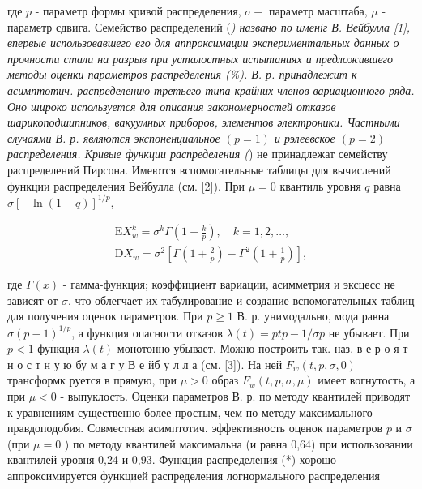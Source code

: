 \documentclass[10pt]{article}
\begin{document}
где $p$ - параметр формы кривой распределения, $\sigma-$ параметр масштаба, $\mu$ - параметр сдвига. Семейство распределений (\textit{) названо по именіг В. Вейбулла [1], впервые использовавшего его для аппроксимации экспериментальных данных о прочности стали на разрыв при усталостных испытаниях и предложившего методы оценки параметров распределения (\%). В. р. принадлежит к асимптотич. распределению третьего типа крайних членов вариационного ряда. Оно широко используется для описания закономерностей отказов шарикоподшипников, вакуумных приборов, элементов әлектроники. Частными случаями В. р. являются экспоненциальное $(p=1)$ и рэлеевское $(p=2)$ распределения. Кривые функции распределения (}) не принадлежат семейству распределений Пирсона. Имеются вспомогательные таблицы для вычислений функции распределения Вейбулла (см. [2]). При $\mu=0$ квантиль уровня $q$ равна $\sigma[-\ln (1-q)]^{1 / p}$,



\[

\begin{gathered}

\mathrm{E} X_{w}^{k}=\sigma^{k} \Gamma\left(1+\frac{k}{p}\right), \quad k=1,2, \ldots, \\

\mathrm{D} X_{w}=\sigma^{2}\left[\Gamma\left(1+\frac{2}{p}\right)-\Gamma^{2}\left(1+\frac{1}{p}\right)\right],

\end{gathered}

\]



где $\Gamma(x)$ - гамма-функция; коэффициент вариации, асимметрия и эксцесс не зависят от $\sigma$, что облегчает их табулирование и создание вспомогательных таблиц для получения оценок параметров. При $p \geqslant 1$ В. р. унимодально, мода равна $\sigma(p-1)^{1 / p}$, а функция опасности отказов $\lambda(t)=p t p-1 / \sigma p$ не убывает. При $p<1$ функция $\lambda(t)$ монотонно убывает. Можно построить так. наз. в е р о я т н о с т н у ю бу м а г у В е йб у л л а (см. [3]). На ней $F_{w}(t, p, \sigma, 0)$ трансформк руется в прямую, при $\mu>0$ образ $F_{w}(t, p, \sigma, \mu)$ имеет вогнутость, а при $\mu<0$ - выпуклость. Оценки параметров В. р. по методу квантилей приводят к уравнениям существенно более простым, чем по методу максимального правдоподобия. Совместная асимптотич. эффективность оценок параметров $p$ и $\sigma$ (при $\mu=0$ ) по методу квантилей максимальна (и равна 0,64) при использовании квантилей уровня 0,24 и 0,93. Функция распределения (*) хорошо аппроксимируется функцией распределения логнормального распределения
\end{document}
